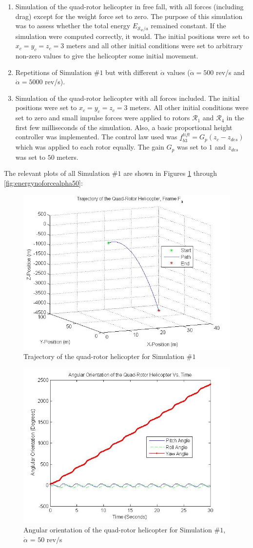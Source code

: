 \documentclass[journal]{IEEEtran}
\begin{document}
\begin{enumerate}
\item Simulation of the quad-rotor helicopter in free fall, with all forces (including drag) except for the weight force set to zero. The purpose of this simulation was to assess whether the total energy $E_{\mathcal{S}_w/a}$ remained constant. If the simulation were computed correctly, it would. The initial positions were set to $x_c=y_c=z_c=3$ meters and all other initial conditions were set to arbitrary non-zero values to give the helicopter some initial movement.
\item Repetitions of Simulation $\#1$ but with different $\dot{\alpha}$ values ($\dot{\alpha}=500$ rev/s and  $\dot{\alpha}=5000$ rev/s). 
\item Simulation of the quad-rotor helicopter with all forces included. The initial positions were set to $x_c=y_c=z_c=3$ meters. All other initial conditions were set to zero and small impulse forces were applied to rotors $\mathcal{R}_1$ and $\mathcal{R}_4$ in the first few milliseconds of the simulation. Also, a basic proportional height controller was implemented. The control law used was $\underline{f}^{lift}_{b3}=G_p(z_c-z_{des})$ which was applied to each rotor equally. The gain $G_p$ was set to $1$ and $z_{des}$ was set to $50$ meters. 
\end{enumerate}

The relevant plots of all Simulation $\#1$ are shown in Figures \ref{fig:trajnoforcealpha50} through \ref{fig:energynoforcealpha50}:

\begin{figure}[ht!!!!]
    \centering
        \includegraphics[width=.30\textwidth]{trajnoforcealpha50}
    \caption{Trajectory of the quad-rotor helicopter for Simulation $\#1$}
    \label{fig:trajnoforcealpha50}
\end{figure}

\begin{figure}[ht!!!!]
    \centering
        \includegraphics[width=.30\textwidth]{angoriennoforcealpha50}
    \caption{Angular orientation of the quad-rotor helicopter for Simulation $\#1$, $\dot{\alpha}$ = $50$ rev/s}
    \label{fig:angoriennoforcealpha50}
\end{figure}
\end{document}
